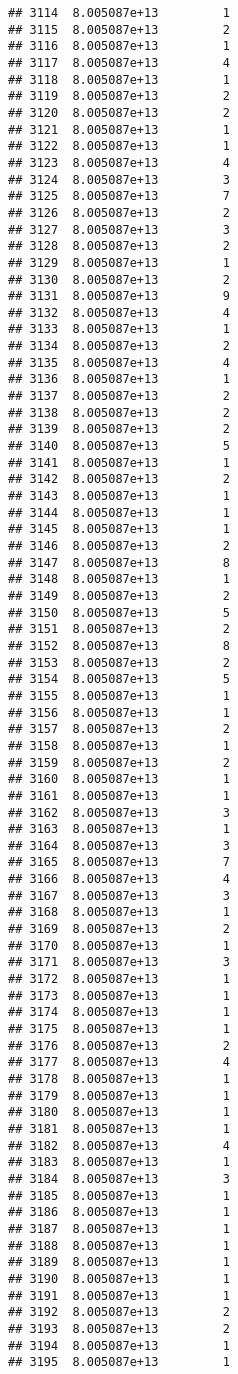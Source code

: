 \documentclass[
]{article}
\begin{document}
\begin{verbatim}
## 3114  8.005087e+13         1
## 3115  8.005087e+13         2
## 3116  8.005087e+13         1
## 3117  8.005087e+13         4
## 3118  8.005087e+13         1
## 3119  8.005087e+13         2
## 3120  8.005087e+13         2
## 3121  8.005087e+13         1
## 3122  8.005087e+13         1
## 3123  8.005087e+13         4
## 3124  8.005087e+13         3
## 3125  8.005087e+13         7
## 3126  8.005087e+13         2
## 3127  8.005087e+13         3
## 3128  8.005087e+13         2
## 3129  8.005087e+13         1
## 3130  8.005087e+13         2
## 3131  8.005087e+13         9
## 3132  8.005087e+13         4
## 3133  8.005087e+13         1
## 3134  8.005087e+13         2
## 3135  8.005087e+13         4
## 3136  8.005087e+13         1
## 3137  8.005087e+13         2
## 3138  8.005087e+13         2
## 3139  8.005087e+13         2
## 3140  8.005087e+13         5
## 3141  8.005087e+13         1
## 3142  8.005087e+13         2
## 3143  8.005087e+13         1
## 3144  8.005087e+13         1
## 3145  8.005087e+13         1
## 3146  8.005087e+13         2
## 3147  8.005087e+13         8
## 3148  8.005087e+13         1
## 3149  8.005087e+13         2
## 3150  8.005087e+13         5
## 3151  8.005087e+13         2
## 3152  8.005087e+13         8
## 3153  8.005087e+13         2
## 3154  8.005087e+13         5
## 3155  8.005087e+13         1
## 3156  8.005087e+13         1
## 3157  8.005087e+13         2
## 3158  8.005087e+13         1
## 3159  8.005087e+13         2
## 3160  8.005087e+13         1
## 3161  8.005087e+13         1
## 3162  8.005087e+13         3
## 3163  8.005087e+13         1
## 3164  8.005087e+13         3
## 3165  8.005087e+13         7
## 3166  8.005087e+13         4
## 3167  8.005087e+13         3
## 3168  8.005087e+13         1
## 3169  8.005087e+13         2
## 3170  8.005087e+13         1
## 3171  8.005087e+13         3
## 3172  8.005087e+13         1
## 3173  8.005087e+13         1
## 3174  8.005087e+13         1
## 3175  8.005087e+13         1
## 3176  8.005087e+13         2
## 3177  8.005087e+13         4
## 3178  8.005087e+13         1
## 3179  8.005087e+13         1
## 3180  8.005087e+13         1
## 3181  8.005087e+13         1
## 3182  8.005087e+13         4
## 3183  8.005087e+13         1
## 3184  8.005087e+13         3
## 3185  8.005087e+13         1
## 3186  8.005087e+13         1
## 3187  8.005087e+13         1
## 3188  8.005087e+13         1
## 3189  8.005087e+13         1
## 3190  8.005087e+13         1
## 3191  8.005087e+13         1
## 3192  8.005087e+13         2
## 3193  8.005087e+13         2
## 3194  8.005087e+13         1
## 3195  8.005087e+13         1

\end{verbatim}
\end{document}
